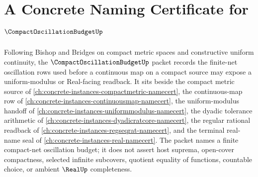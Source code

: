 \chapter{A Concrete Naming Certificate for $\CompactOscillationBudgetUp$}
\label{ch:concrete-instances-compact-oscillation-budget-namecert}

Following Bishop and Bridges on compact metric spaces and constructive uniform continuity, the $\CompactOscillationBudgetUp$ packet records the finite-net oscillation rows used before a continuous map on a compact source may expose a uniform-modulus or Real-facing readback. It sits beside the compact metric source of \autoref{ch:concrete-instances-compactmetric-namecert}, the continuous-map row of \autoref{ch:concrete-instances-continuousmap-namecert}, the uniform-modulus handoff of \autoref{ch:concrete-instances-uniformmodulus-namecert}, the dyadic tolerance arithmetic of \autoref{ch:concrete-instances-dyadicratcore-namecert}, the regular rational readback of \autoref{ch:concrete-instances-regseqrat-namecert}, and the terminal real-name seal of \autoref{ch:concrete-instances-real-namecert}. The packet names a finite compact-net oscillation budget; it does not assert host suprema, open-cover compactness, selected infinite subcovers, quotient equality of functions, countable choice, or ambient $\RealUp$ completeness.

